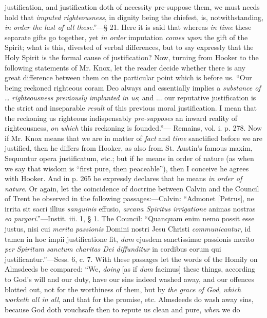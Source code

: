 justification, and justification doth of necessity pre-suppose them,
we must needs hold that \emph{imputed righteousness}, in dignity being
the chiefest, is, notwithstanding, \emph{in order the last of all these}.''—§
21. Here it is said that whereas \emph{in time} these separate gifts
go together, yet \emph{in order} imputation \emph{comes upon} the gift
of the Spirit; what is this, divested of verbal differences, but to
say expressly that the Holy Spirit is the formal cause of
justification? Now, turning from Hooker to the following statements of
Mr. Knox, let the reader decide whether there is any great difference
between them on the particular point which is before us. ``Our
being reckoned righteous coram Deo always and essentially implies a \emph{substance
of} … \emph{righteousness previously implanted in us}; and ...
our reputative justification is the strict and inseparable \emph{result}
of this previous moral justification. I mean that the reckoning us
righteous indispensably \emph{pre-supposes} an inward reality of
righteousness, \emph{on which} this reckoning is founded.''— Remains, vol. i. p. 278. Now if Mr. Knox means that we are in matter
of \emph{fact} and \emph{time} sanctified before we are justified,
then he differs from Hooker, as also from St. Austin's famous maxim,
Sequuntur opera justificatum, etc.; but if he means in order of nature
(as when we say that wisdom is ``first pure, then
peaceable''), then I conceive he agrees with Hooker. And in p. 265
he expressly declares that he means \emph{in order of nature}. Or again, let
the coincidence of doctrine between Calvin and the Council of Trent be
observed in the following passages:—Calvin: ``Admonet [Petrus],
ne irrita sit sacri illius \emph{sanguinis} effusio, \emph{arcana
Spiritus irrigatione} animas nostras \emph{eo purgari}.''—Instit.
iii. 1, § 1. The Council: ``Quanquam enim nemo possit esse justus,
nisi cui \emph{merita passionis} Domini nostri Jesu Christi \emph{communicantur},
id tamen in hoc impii justificatione fit, \emph{dum} ejusdem sanctissimæ
passionis merito \emph{per Spiritum sanctum charitas Dei diffunditur}
in cordibus eorum qui justificantur.''—Sess. 6, c. 7. With these
passages let the words of the Homily on Almsdeeds be compared:
``We, \emph{doing} [as if \emph{dum} facimus] these things,
according to God's will and our duty, have our sins indeed washed
away, and our offences blotted out, not for the worthiness of them,
but by \emph{the grace of God}, \emph{which worketh all in all}, and
that for the promise, etc. Almsdeeds do wash away sins, because God
doth vouchsafe then to repute us clean and pure, \emph{when} we do
